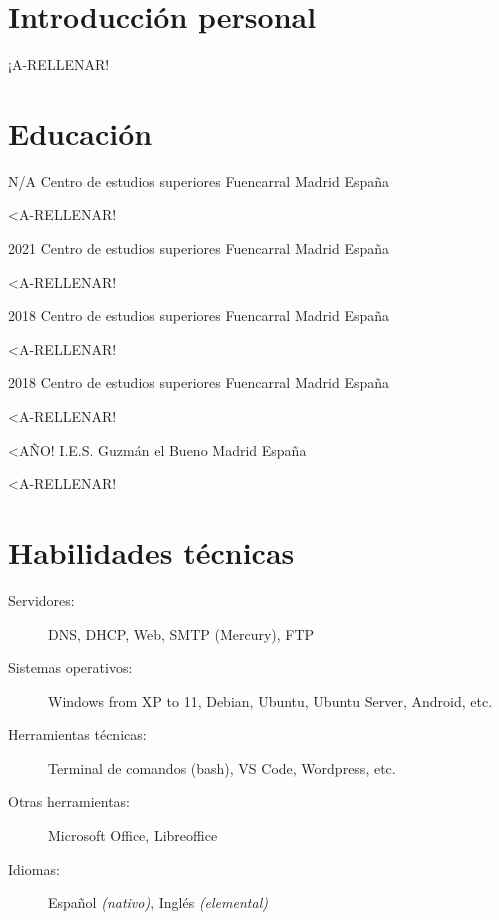 \documentclass[10pt]{CurriculumVitae}
\begin{document}
  \makeheading


  \section{Introducción personal}
    {
      ¡A-RELLENAR!
    }


  \section{Educación}

      {N/A}
      {Centro de estudios superiores Fuencarral}
      {Madrid}
      {España}
      {
        \item <A-RELLENAR!
      }

      {2021}
      {Centro de estudios superiores Fuencarral}
      {Madrid}
      {España}
      {
        \item <A-RELLENAR!
      }

      {2018}
      {Centro de estudios superiores Fuencarral}
      {Madrid}
      {España}
      {
        \item <A-RELLENAR!
      }

      {2018}
      {Centro de estudios superiores Fuencarral}
      {Madrid}
      {España}
      {
        \item <A-RELLENAR!
      }

      {<AÑO!}
      {I.E.S. Guzmán el Bueno}
      {Madrid}
      {España}
      {
        \item <A-RELLENAR!
      }


  \section{Habilidades técnicas}
    
    \begin{description}
      \item[Servidores:] DNS, DHCP, Web, SMTP (Mercury), FTP
      \item[Sistemas operativos:] Windows from XP to 11, Debian, Ubuntu, Ubuntu Server, Android, etc.
      \item[Herramientas técnicas:] Terminal de comandos (bash), VS Code, Wordpress, etc.
      \item[Otras herramientas:] Microsoft Office, Libreoffice
      \item[Idiomas:] Español \emph{(nativo)}, Inglés \emph{(elemental)}
    \end{description}
\end{document}
